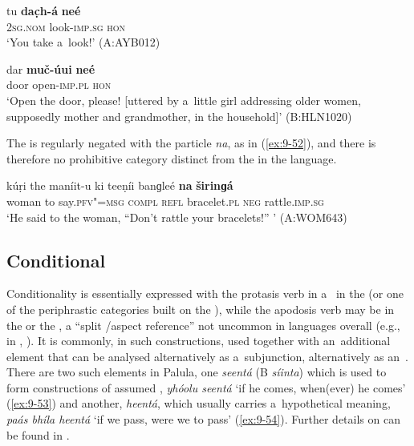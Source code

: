 \begin{exe}
\ex
\label{ex:9-50}
\gll tu \textbf{dac̣h-á} \textbf{neé} \\
\textsc{2sg.nom} look-\textsc{imp.sg} \textsc{hon}  \\
\glt `You take a~look!' (A:AYB012)

\ex
\label{ex:9-51}
\gll dar \textbf{muč-úui} \textbf{neé} \\
door open-\textsc{imp.pl} \textsc{hon} \\
\glt `Open the door, please! [uttered by a~little girl addressing older women, supposedly mother and grandmother, in the household]' (B:HLN1020)
\end{exe}

The  is regularly negated with the  particle \textit{na}, as in (\ref{ex:9-52}), and there is therefore no prohibitive category distinct from the  in the language.

\begin{exe}
\ex
\label{ex:9-52}
\gll kúṛi the maníit-u ki teeṇíi banɡleé \textbf{na} \textbf{širinɡá} \\
woman to say.\textsc{pfv"=msg} \textsc{compl} \textsc{refl} bracelet.\textsc{pl} \textsc{neg} rattle.\textsc{imp.sg} \\
\glt `He said to the woman, ``Don't rattle your bracelets!'' ' (A:WOM643)
\end{exe}

\subsection{Conditional}
\label{subsec:9-2-2}

Conditionality is essentially expressed with the protasis verb in a~  in the  (or one of the periphrastic categories built on the ), while the apodosis verb may be in the  or the , a ``split /aspect reference'' not uncommon in languages overall (e.g., in \iliArabic, \citealt[80]{dahl1985}). It is commonly, in such constructions, used together with an~additional element that can be analysed alternatively as a~subjunction, alternatively as an~. There are two such elements in Palula, one \textit{seentá} (B \textit{síinta}) which is used to form constructions of assumed , \textit{yhóolu seentá} `if he comes, when(ever) he comes' (\ref{ex:9-53}) and another, \textit{heentá}, which usually carries a~hypothetical meaning, \textit{paás bhíla heentá} `if we pass, were we to pass' (\ref{ex:9-54}). Further details on  can be found in . 

